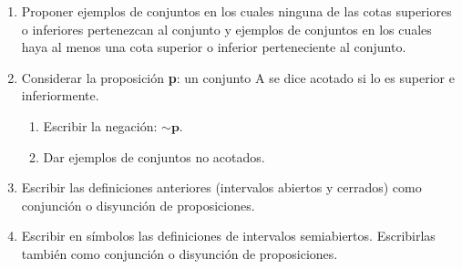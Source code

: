 \documentclass[12pt]{article}
\theoremstyle{definition}
\newtheorem*{mydef}{Definición}
\begin{document}
\begin{enumerate}
\item Proponer ejemplos de conjuntos en los cuales ninguna de las cotas superiores o inferiores pertenezcan al conjunto y ejemplos de conjuntos en los cuales haya al menos una cota superior o inferior perteneciente al conjunto.

\item Considerar la proposición \textbf{p}: un conjunto A se dice acotado si lo es superior e inferiormente.  
\begin{enumerate}
\setlength\itemsep{0em}
\item Escribir la negación: $\sim \mathbf{p}$.
\item Dar ejemplos de conjuntos no acotados.
\end{enumerate}

\item Escribir las definiciones anteriores (intervalos abiertos y cerrados) como conjunción o disyunción de proposiciones.

\item  Escribir en símbolos las definiciones de intervalos semiabiertos.  Escribirlas también como conjunción o disyunción de proposiciones.


\end{enumerate}
\end{document}
